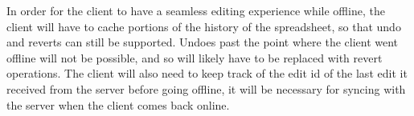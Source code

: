 In order for the client to have a seamless editing experience while offline, the client will have to cache portions of the history of the spreadsheet, so that undo and reverts can still be supported. Undoes past the point where the client went offline will not be possible, and so will likely have to be replaced with revert operations. The client will also need to keep track of the edit id of the last edit it received from the server before going offline, it will be necessary for syncing with the server when the client comes back online.